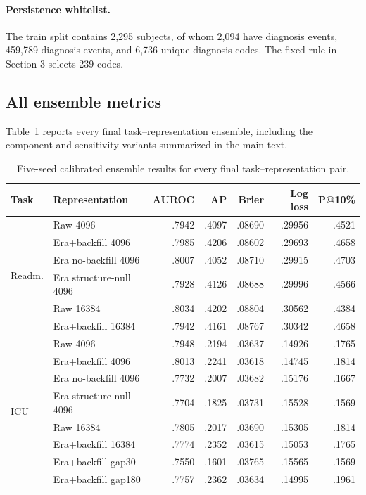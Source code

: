 \documentclass{article}
\begin{document}
\FloatBarrier

\paragraph{Persistence whitelist.}
The train split contains 2,295 subjects, of whom 2,094 have diagnosis events,
459,789 diagnosis events, and 6,736 unique diagnosis codes. The fixed rule in
Section 3 selects 239 codes.

\subsection{All ensemble metrics}

Table~\ref{tab:all_metrics} reports every final task--representation ensemble,
including the component and sensitivity variants summarized in the main text.

\begin{table}[htbp]
  \caption{Five-seed calibrated ensemble results for every final
  task--representation pair.}
  \label{tab:all_metrics}
  \centering
  \small
  \begin{tabular*}{\linewidth}{@{\extracolsep{\fill}}llrrrrr@{}}
    \toprule
    Task & Representation & AUROC & AP & Brier & Log loss & P@10\% \\
    \midrule
    \multirow{6}{*}{Readm.}
      & Raw 4096 & .7942 & .4097 & .08690 & .29956 & .4521 \\
      & Era+backfill 4096 & .7985 & .4206 & .08602 & .29693 & .4658 \\
      & Era no-backfill 4096 & .8007 & .4052 & .08710 & .29915 & .4703 \\
      & Era structure-null 4096 & .7928 & .4126 & .08688 & .29996 & .4566 \\
      & Raw 16384 & .8034 & .4202 & .08804 & .30562 & .4384 \\
      & Era+backfill 16384 & .7942 & .4161 & .08767 & .30342 & .4658 \\
    \midrule
    \multirow{8}{*}{ICU}
      & Raw 4096 & .7948 & .2194 & .03637 & .14926 & .1765 \\
      & Era+backfill 4096 & .8013 & .2241 & .03618 & .14745 & .1814 \\
      & Era no-backfill 4096 & .7732 & .2007 & .03682 & .15176 & .1667 \\
      & Era structure-null 4096 & .7704 & .1825 & .03731 & .15528 & .1569 \\
      & Raw 16384 & .7805 & .2017 & .03690 & .15305 & .1814 \\
      & Era+backfill 16384 & .7774 & .2352 & .03615 & .15053 & .1765 \\
      & Era+backfill gap30 & .7550 & .1601 & .03765 & .15565 & .1569 \\
      & Era+backfill gap180 & .7757 & .2362 & .03634 & .14995 & .1961 \\
    \bottomrule
  \end{tabular*}
\end{table}
\end{document}
